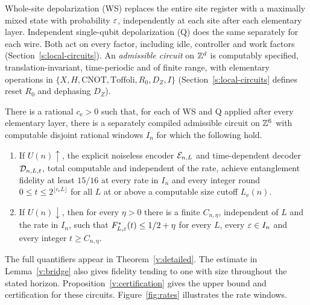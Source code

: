 Whole-site depolarization (WS) replaces the entire site register with a maximally mixed state with probability \(\varepsilon\), independently at each site after each elementary layer. Independent single-qubit depolarization (Q) does the same separately for each wire. Both act on every factor, including idle, controller and work factors (Section~\ref{s:local-circuits}). An \emph{admissible circuit} on \(\mathbb Z^d\) is computably specified, translation-invariant, time-periodic and of finite range, with elementary operations in \(\{X,H,\mathrm{CNOT},\mathrm{Toffoli},R_0,D_Z,I\}\) (Section~\ref{s:local-circuits} defines reset \(R_0\) and dephasing \(D_Z\)).

\begin{maintheorem}\label{thm:exponential}
There is a rational \(c_{\mathrm e}>0\) such that, for each of \textup{WS} and \textup{Q} applied after every elementary layer, there is a separately compiled admissible circuit on \(\mathbb Z^6\) with computable disjoint rational windows \(I_n\) for which the following hold.
\begin{enumerate}
\item If \(U(n)\uparrow\), the explicit noiseless encoder \(\mathcal E_{n,L}\) and time-dependent decoder \(\mathcal D_{n,L,t}\), total computable and independent of the rate, achieve entanglement fidelity at least \(15/16\) at every rate in \(I_n\) and every integer round \(0\le t\le 2^{\lfloor c_{\mathrm e}L\rfloor}\) for all \(L\) at or above a computable size cutoff \(L_{\mathrm e}(n)\).
\item If \(U(n)\downarrow\), then for every \(\eta>0\) there is a finite \(C_{n,\eta}\), independent of \(L\) and the rate in \(I_n\), such that \(F^*_{L,\varepsilon}(t)\le 1/2+\eta\) for every \(L\), every \(\varepsilon\in I_n\) and every integer \(t\ge C_{n,\eta}\).
\end{enumerate}
\end{maintheorem}

The full quantifiers appear in Theorem~\ref{v:detailed}. The estimate in Lemma~\ref{v:bridge} also gives fidelity tending to one with size throughout the stated horizon. Proposition~\ref{v:certification} gives the upper bound and certification for these circuits. Figure~\ref{fig:rates} illustrates the rate windows.

